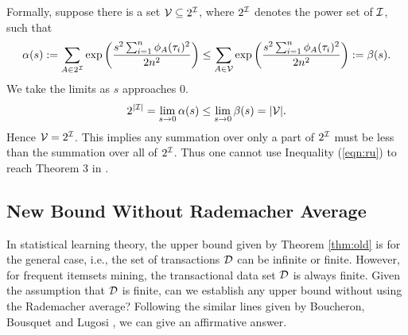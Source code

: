 \documentclass{article}
\begin{document}
Formally, suppose there is a set $\mathcal{V}\subseteq 2^{\mathcal{I}}$, where $2^{\mathcal{I}}$ denotes the power set of $\mathcal{I}$, such that
$$\alpha(s) := \sum_{A\in 2^{\mathcal{I}}}\exp\left(\frac{s^2\sum_{i=1}^n \phi_A(\tau_i)^2}{2n^2}\right) \leq \sum_{A\in \mathcal{V}}\exp\left(\frac{s^2\sum_{i=1}^n \phi_A(\tau_i)^2}{2n^2}\right) :=\beta(s).$$
We take the limits as $s$ approaches 0.
$$2^{|\mathcal{I}|}=\lim_{s\to 0}\alpha(s) \leq \lim_{s\to 0}\beta(s) = |\mathcal{V}|.$$
Hence $\mathcal{V} = 2^{\mathcal{I}}$. This implies any summation over only a part of $2^{\mathcal{I}}$ must be less than the summation over all of $2^{\mathcal{I}}$. Thus one cannot use Inequality (\ref{eqn:ru}) to reach Theorem 3 in \cite{RU15}.

\subsection{New Bound Without Rademacher Average}
In statistical learning theory, the upper bound given by Theorem \ref{thm:old} is for the general case, i.e., the set of transactions $\mathcal{D}$ can be infinite or finite. However, for frequent itemsets mining, the transactional data set $\mathcal{D}$ is always finite. Given the assumption that $\mathcal{D}$ is finite, can we establish any upper bound without using the Rademacher average? Following the similar lines given by Boucheron, Bousquet and Lugosi \cite{BBL04}, we can give an affirmative answer.
\end{document}

